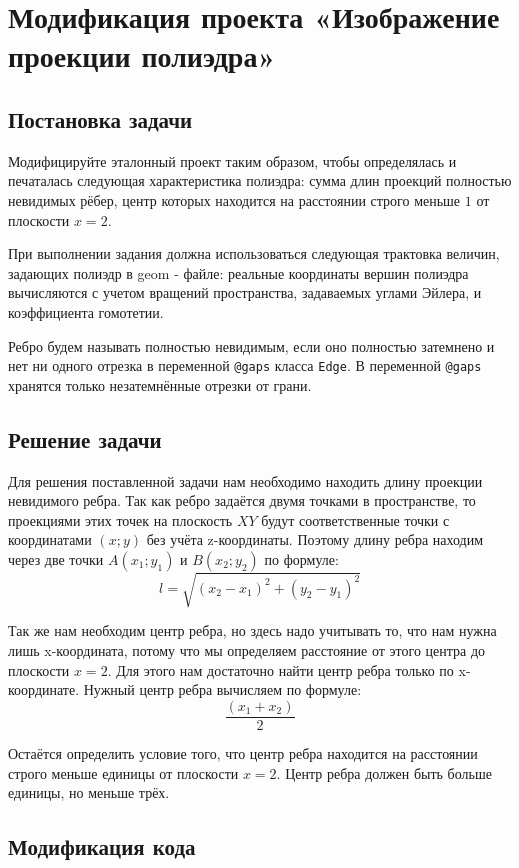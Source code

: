 \section{Модификация проекта «Изображение проекции полиэдра»}
\subsection{Постановка задачи}

Модифицируйте эталонный проект таким образом, чтобы определялась и печаталась следующая характеристика полиэдра: сумма длин проекций полностью невидимых рёбер, центр которых находится на расстоянии строго меньше $1$ от плоскости $x=2$.

При выполнении задания должна использоваться следующая трактовка величин,
задающих полиэдр в geom - файле: реальные координаты вершин полиэдра вычисляются с учетом вращений пространства, задаваемых углами Эйлера, и коэффициента
гомотетии.

Ребро будем называть полностью невидимым, если оно полностью затемнено и нет ни одного отрезка в переменной \verb|@gaps| класса \verb|Edge|. В переменной \verb|@gaps| хранятся только незатемнённые отрезки от грани.

\subsection{Решение задачи}
Для решения поставленной задачи нам необходимо находить длину проекции невидимого ребра. Так как ребро задаётся двумя точками в пространстве, то проекциями этих точек на плоскость $XY$ будут соответственные точки с координатами $(x;y)$ без учёта z-координаты. Поэтому длину ребра находим через две точки $A(x_1;y_1)$ и $B(x_2;y_2)$ по формуле:
$$l=\sqrt{(x_2-x_1)^2+(y_2-y_1)^2}$$

Так же нам необходим центр ребра, но здесь надо учитывать то, что нам нужна лишь x-координата, потому что мы определяем расстояние от этого центра до плоскости $x=2$. Для этого нам достаточно найти центр ребра только по x-координате. Нужный центр ребра вычисляем по формуле:
$$\frac{(x_1+x_2)}{2}$$

Остаётся определить условие того, что центр ребра находится на расстоянии строго меньше единицы от плоскости $x=2$. Центр ребра должен быть больше единицы, но меньше трёх.

\subsection{Модификация кода}

